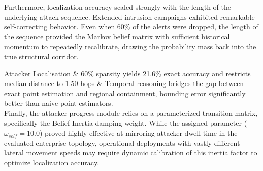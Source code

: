 Furthermore, localization accuracy scaled strongly with the length of the underlying attack sequence. Extended intrusion campaigns exhibited remarkable self-correcting behavior. Even when 60\% of the alerts were dropped, the length of the sequence provided the Markov belief matrix with sufficient historical momentum to repeatedly recalibrate, drawing the probability mass back into the true structural corridor.

Attacker Localisation & 
60\% sparsity yields 21.6\% exact accuracy and restricts median distance to 1.50 hops & 
Temporal reasoning bridges the gap between exact point estimation and regional containment, bounding error significantly better than naive point-estimators. \\

Finally, the attacker-progress module relies on a parameterized transition matrix, specifically the Belief Inertia damping weight. While the assigned parameter ($\omega_{self} = 10.0$) proved highly effective at mirroring attacker dwell time in the evaluated enterprise topology, operational deployments with vastly different lateral movement speeds may require dynamic calibration of this inertia factor to optimize localization accuracy.
